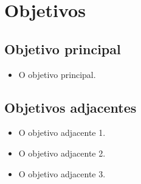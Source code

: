 \chapter{Objetivos}
\section{Objetivo principal}
\begin{itemize}
    \item O objetivo principal.
\end{itemize}
\section{Objetivos adjacentes}
\begin{itemize}
    \item O objetivo adjacente 1. 
    \item O objetivo adjacente 2. 
    \item O objetivo adjacente 3. 

\end{itemize}